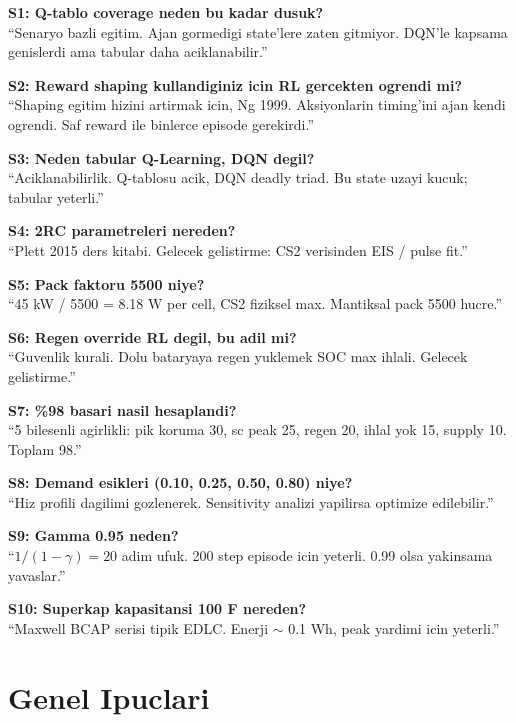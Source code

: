 \documentclass[11pt,a4paper]{article}
\begin{document}
\textbf{S1: Q-tablo coverage neden bu kadar dusuk?}\\
``Senaryo bazli egitim. Ajan gormedigi state'lere zaten gitmiyor. DQN'le kapsama genislerdi ama tabular daha aciklanabilir.''

\textbf{S2: Reward shaping kullandiginiz icin RL gercekten ogrendi mi?}\\
``Shaping egitim hizini artirmak icin, Ng 1999. Aksiyonlarin timing'ini ajan kendi ogrendi. Saf reward ile binlerce episode gerekirdi.''

\textbf{S3: Neden tabular Q-Learning, DQN degil?}\\
``Aciklanabilirlik. Q-tablosu acik, DQN deadly triad. Bu state uzayi kucuk; tabular yeterli.''

\textbf{S4: 2RC parametreleri nereden?}\\
``Plett 2015 ders kitabi. Gelecek gelistirme: CS2 verisinden EIS / pulse fit.''

\textbf{S5: Pack faktoru 5500 niye?}\\
``45 kW / 5500 = 8.18 W per cell, CS2 fiziksel max. Mantiksal pack 5500 hucre.''

\textbf{S6: Regen override RL degil, bu adil mi?}\\
``Guvenlik kurali. Dolu bataryaya regen yuklemek SOC max ihlali. Gelecek gelistirme.''

\textbf{S7: \%98 basari nasil hesaplandi?}\\
``5 bilesenli agirlikli: pik koruma 30, sc peak 25, regen 20, ihlal yok 15, supply 10. Toplam 98.''

\textbf{S8: Demand esikleri (0.10, 0.25, 0.50, 0.80) niye?}\\
``Hiz profili dagilimi gozlenerek. Sensitivity analizi yapilirsa optimize edilebilir.''

\textbf{S9: Gamma 0.95 neden?}\\
``$1/(1-\gamma) = 20$ adim ufuk. 200 step episode icin yeterli. 0.99 olsa yakinsama yavaslar.''

\textbf{S10: Superkap kapasitansi 100 F nereden?}\\
``Maxwell BCAP serisi tipik EDLC. Enerji $\sim$ 0.1 Wh, peak yardimi icin yeterli.''

\section*{Genel Ipuclari}
\end{document}
